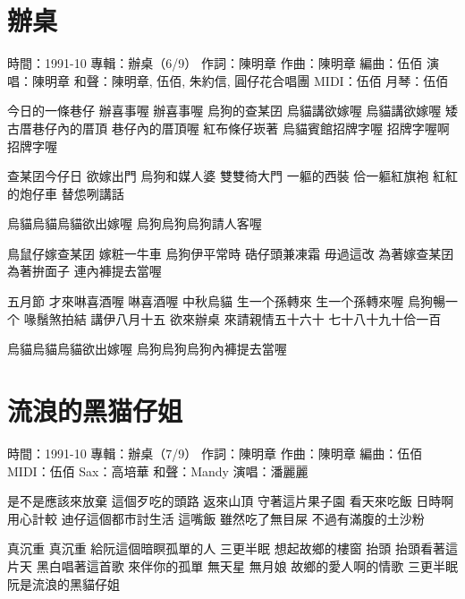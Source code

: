 \documentclass[UTF8,a4paper,oneside,twocolumn,12pt]{ctexbook}
\newcommand{\infopair}[2]{\textbullet #1：#2}
\newcommand{\zc}[1][伍佰]{\infopair{作詞}{#1}}
\newcommand{\zq}[1][伍佰]{\infopair{作曲}{#1}}
\newcommand{\bq}[1][伍佰]{\infopair{編曲}{#1}}
\newcommand{\zj}[1]{\infopair{專輯}{#1}}
\newcommand{\sj}[1]{\infopair{時間}{#1}}
\newenvironment{info}{\begin{flushleft}\kaishu
	}
	{\end{flushleft}\normalsize\yahei\par}
\newenvironment{lyric}{
	}
{}
\begin{document}
\section{辦桌}
\begin{info}
	\sj{1991-10}
	\zj{辦桌（6/9）}
	\zc[陳明章]
	\zq[陳明章]
	\bq[伍佰]
	\infopair{演唱}{陳明章}
	\infopair{和聲}{陳明章, 伍佰, 朱約信, 圓仔花合唱團}
	\infopair{MIDI}{伍佰}
	\infopair{月琴}{伍佰}
\end{info}
\begin{lyric}
	今日的一條巷仔 辦喜事喔 辦喜事喔
	烏狗的查某囝 烏貓講欲嫁喔 烏貓講欲嫁喔
	矮古厝巷仔內的厝頂 巷仔內的厝頂喔
	紅布條仔崁著 烏貓賓館招牌字喔 招牌字喔啊招牌字喔

	查某囝今仔日 欲嫁出門
	烏狗和媒人婆 雙雙徛大門
	一軀的西裝 佮一軀紅旗袍
	紅紅的炮仔車 替怹咧講話

	烏貓烏貓烏貓欲出嫁喔
	烏狗烏狗烏狗請人客喔

	鳥鼠仔嫁查某囝 嫁粧一牛車
	烏狗伊平常時 硞仔頭兼凍霜
	毋過這改 為著嫁查某囝
	為著拚面子 連內褲提去當喔

	五月節 才來啉喜酒喔 啉喜酒喔
	中秋烏貓 生一个孫轉來
	生一个孫轉來喔
	烏狗暢一个 喙鬚煞拍結
	講伊八月十五 欲來辦桌
	來請親情五十六十 七十八十九十佮一百

	烏貓烏貓烏貓欲出嫁喔
	烏狗烏狗烏狗內褲提去當喔
\end{lyric}

\section{流浪的黑猫仔姐}
\begin{info}
	\sj{1991-10}
	\zj{辦桌（7/9）}
	\zc[陳明章]
	\zq[陳明章]
	\bq[伍佰]
	\infopair{MIDI}{伍佰}
	\infopair{Sax}{高培華}
	\infopair{和聲}{Mandy}
	\infopair{演唱}{潘麗麗}
\end{info}
\begin{lyric}
	是不是應該來放棄 這個歹吃的頭路
	返來山頂
	守著這片果子園 看天來吃飯
	日時啊用心計較
	迪仔這個都市討生活
	這嘴飯
	雖然吃了無目屎 不過有滿腹的土沙粉

	真沉重 真沉重
	給阮這個暗瞑孤單的人
	三更半眠 想起故鄉的樓窗
	抬頭 抬頭看著這片天
	黑白唱著這首歌 來伴你的孤單
	無天星 無月娘 故鄉的愛人啊的情歌
	三更半眠 阮是流浪的黑貓仔姐
\end{lyric}
\end{document}

